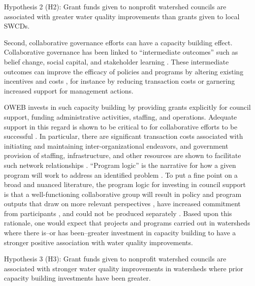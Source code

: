 \documentclass[12pt,a4paper,titlepage]{article}
\begin{document}
\begin{description}
\item{Hypothesis 2 (H2): Grant funds given to nonprofit watershed councils are associated with greater water quality improvements than grants given to local SWCDs.}
\end{description}

Second, collaborative governance efforts can have a capacity building effect. Collaborative governance has been linked to “intermediate outcomes” \parencite{carr2012} such as belief change, social capital, and stakeholder learning \parencite[e.g.,][]{leach2013,gerlak2011,calanni2014}. These intermediate outcomes can improve the efficacy of policies and programs by altering existing incentives and costs \parencite{schneider2003}, for instance by reducing transaction costs or garnering increased support for management actions. 

OWEB invests in such capacity building by providing grants explicitly for council support, funding administrative activities, staffing, and operations. Adequate support in this regard is shown to be critical to for collaborative efforts to be successful \parencite{lubell2009}. In particular, there are significant transaction costs associated with initiating and maintaining inter-organizational endeavors, and government provision of staffing, infrastructure, and other resources are shown to facilitate such network relationships \parencite{schneider2003}. “Program logic” \parencite{bickman1987} is the narrative for how a given program will work to address an identified problem \parencite{margerum2011,mclaughlin1999}. To put a fine point on a broad and nuanced literature, the program logic for investing in council support is that a well-functioning collaborative group will result in policy and program outputs that draw on more relevant perspectives \parencite{ansell2008,oleary2006,leach2006}, have increased commitment from participants \parencite{bryson2006,ansell2008}, and could not be produced separately \parencite{emerson2012}. Based upon this rationale, one would expect that projects and programs carried out in watersheds where there is--or has been--greater investment in capacity building to have a stronger positive association with water quality improvements. 

\begin{description}
\item{Hypothesis 3 (H3): Grant funds given to nonprofit watershed councils are associated with stronger water quality improvements in watersheds where prior capacity building investments have been greater.}
\end{description}
\end{document}

